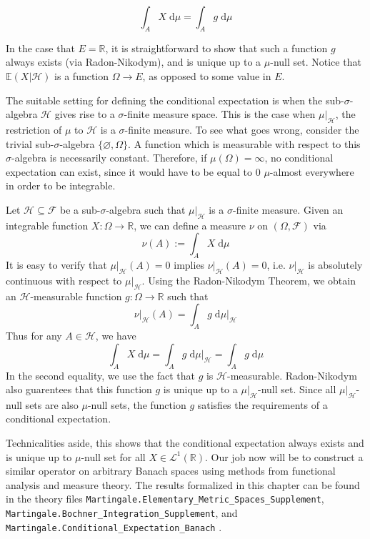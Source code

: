 \[
	\int_A X \; \textrm{d} \mu = \int_A g \; \textrm{d} \mu
\]

In the case that $E = \mathbb{R}$, it is straightforward to show that such a function $g$ always exists (via Radon-Nikodym), and is unique up to a $\mu$-null set. Notice that $\mathbb{E}(X \vert \mathcal{H})$ is a function $\Omega \rightarrow E$, as opposed to some value in $E$.

The suitable setting for defining the conditional expectation is when the sub-$\sigma$-algebra $\mathcal{H}$ gives rise to a $\sigma$-finite measure space. This is the case when $\mu\vert_\mathcal{H}$, the restriction of $\mu$ to $\mathcal{H}$ is a $\sigma$-finite measure. To see what goes wrong, consider the trivial sub-$\sigma$-algebra $\{\varnothing, \Omega\}$. A function which is measurable with respect to this $\sigma$-algebra is necessarily constant. Therefore, if $\mu(\Omega) = \infty$, no conditional expectation can exist, since it would have to be equal to $0$ $\mu$-almost everywhere in order to be integrable.

\vspace{0.3cm}
\begin{example}
Let $\mathcal{H} \subseteq \mathcal{F}$ be a sub-$\sigma$-algebra such that $\mu\vert_\mathcal{H}$ is a $\sigma$-finite measure. Given an integrable function $X : \Omega \rightarrow \mathbb{R}$, we can define a measure $\nu$ on $(\Omega, \mathcal{F})$ via
\[
	\nu(A) := \int_A X \; \textrm{d}\mu
\]
It is easy to verify that $\mu\vert_\mathcal{H}(A) = 0$ implies $\nu\vert_\mathcal{H}(A) = 0$, i.e. $\nu\vert_\mathcal{H}$ is absolutely continuous with respect to $\mu\vert_\mathcal{H}$. Using the Radon-Nikodym Theorem, we obtain an $\mathcal{H}$-measurable function $g : \Omega \rightarrow \mathbb{R}$ such that
\[
	\nu\vert_\mathcal{H}(A) = \int_A g \;\textrm{d}\mu\vert_\mathcal{H}
\]
Thus for any $A \in \mathcal{H}$, we have
\[
	\int_A X \; \textrm{d}\mu = \int_A g \;\textrm{d}\mu\vert_\mathcal{H} = \int_A g \;\textrm{d}\mu
\]
In the second equality, we use the fact that $g$ is $\mathcal{H}$-measurable. Radon-Nikodym also guarentees that this function $g$ is unique up to a $\mu\vert_\mathcal{H}$-null set. Since all $\mu\vert_\mathcal{H}$-null sets are also $\mu$-null sets, the function $g$ satisfies the requirements of a conditional expectation.
\end{example}
\vspace{0.3cm}

Technicalities aside, this shows that the conditional expectation always exists and is unique up to $\mu$-null set for all $X \in \mathcal{L}^1(\mathbb{R})$. Our job now will be to construct a similar operator on arbitrary Banach spaces using methods from functional analysis and measure theory. The results formalized in this chapter can be found in the theory files \texttt{Martingale.Elementary\_Metric\_Spaces\_Supplement}, \;\texttt{Martingale.Bochner\_Integra\-tion\_Supplement}, and \texttt{Martingale.Conditional\_Expectation\_Banach} \cite{Keskin_A_Formalization_of_2023}.


